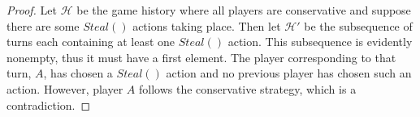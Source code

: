 \begin{proof}
   Let $\mathcal{H}$ be the game history where all players are conservative and suppose there are some
   $Steal\left(\right)$ actions taking place. Then let $\mathcal{H}'$ be the subsequence of turns each containing at
   least one $Steal\left(\right)$ action. This subsequence is evidently nonempty, thus it must have a first element. The
   player corresponding to that turn, $A$, has chosen a $Steal\left(\right)$ action and no previous player has chosen
   such an action. However, player $A$ follows the conservative strategy, which is a contradiction.
\end{proof}
